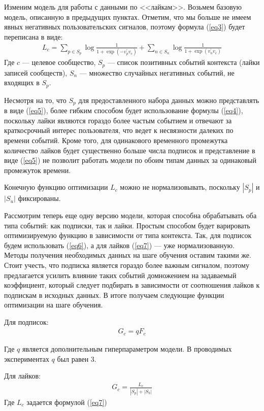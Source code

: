 \documentclass[times,specification,annotation]{itmo-student-thesis}
\begin{document}
Изменим модель для работы с данными по <<лайкам>>. Возьмем базовую модель, описанную в предыдущих пунктах. Отметим, что мы больше не имеем явных негативных пользовательских сигналов, поэтому формула (\ref{eq3}) будет переписана в виде:
\begin{align}
L_c = \sum_{p \in S_p} \log \frac{1}{1 + \exp(-v_p^{'}v_c)} + \sum_{n \in S_n} \log \frac{1}{1 + \exp(v_n^{'}v_c)} \label{eq7}
 \end{align}
Где $c$ --- целевое сообщество, $S_p$ --- список позитивных событий
контекста (лайки записей сообществ), $S_n$ --- множество случайных негативных событий, не входящих в $S_p$. 

Несмотря на то, что $S_p$ для предоставленного набора данных можно представлять в виде (\ref{eq5}), более гибким способом будет использование формулы (\ref{eq4}), поскольку лайки являются гораздо более частым событием и отвечают за краткосрочный интерес пользователя, что ведет к несвязности далеких по времени событий. Кроме того, для одинакового временного промежутка количество лайков будет существенно больше числа подписок и представление в виде (\ref{eq5}) не позволит работать модели по обоим типам данных за одинаковый промежуток времени. 

Конечную функцию оптимизации  $L_c$ можно не нормализовывать, поскольку $|S_p|$ и $|S_u|$ фиксированы.

Рассмотрим теперь еще одну версию модели, которая способна обрабатывать оба типа событий: как подписки, так и лайки. Простым способом будет варировать оптимизируемую функцию в зависимости от типа контекста. Так, для подписок будем использовать (\ref{eq6}), а для лайков (\ref{eq7}) --- уже нормализованную. Методы получения необходимых данных на шаге обучения оставим такими же. Стоит учесть, что подписка является гораздо более важным сигналом, поэтому предлагается усилить влияние таких событий домножением на задаваемый коэффициент, который следует подбирать в зависимости от соотношения лайков к подпискам в исходных данных. В итоге получаем следующие функции оптимизации на шаге обучения.

Для подписок:
\begin{align*}
G_c = qF_c
\end{align*}

Где $q$ является дополнительным гиперпараметром модели. В проводимых экспериментах $q$ был равен 3.

Для лайков:
\begin{align*}
G_c = \frac{L_c}{|S_p| +|S_b|} 
\end{align*}
Где $L_c$ задается формулой  (\ref{eq7})
\end{document}
